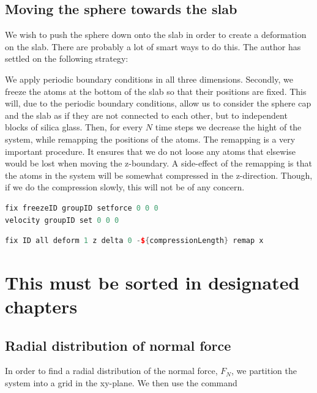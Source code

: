 \documentclass[twoside,english]{uiofysmaster}
\begin{document}
\section{Moving the sphere towards the slab}
We wish to push the sphere down onto the slab in order to create a deformation on the slab. There are probably a lot of smart ways to do this. The author has settled on the following strategy:

We apply periodic boundary conditions in all three dimensions. 
Secondly, we freeze the atoms at the bottom of the slab so that their positions are fixed. 
This will, due to the periodic boundary conditions, allow us to consider the sphere cap and the slab as if they are not connected to each other, but to independent blocks of silica glass.  
Then, for every $N$ time steps we decrease the hight of the system, while remapping the positions of the atoms. 
The remapping is a very important procedure. 
It ensures that we do not loose any atoms that elsewise would be lost when moving the z-boundary. 
A side-effect of the remapping is that the atoms in the system will be somewhat compressed in the z-direction. 
Though, if we do the compression slowly, this will not be of any concern. 

\begin{lstlisting}[caption={LAMMPS commands for hard coding the forces and velocities of atoms within a specific group. Effectively freezing them.}, label={FreezeStuff}, language=c++]
fix freezeID groupID setforce 0 0 0
velocity groupID set 0 0 0
\end{lstlisting}

\begin{lstlisting}[caption={LAMMPS command for changing the size of the simulation box.}, label={Deform}, language=c++]
fix ID all deform 1 z delta 0 -${compressionLength} remap x
\end{lstlisting}
 



\chapter{This must be sorted in designated chapters}

\section{Radial distribution of normal force}
In order to find a radial distribution of the normal force, $F_N$, we partition the system into a grid in  the xy-plane. We then use the command 
\end{document}
